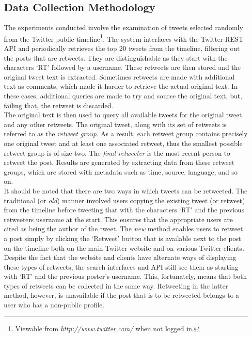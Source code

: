 \subsection{Data Collection Methodology}
The experiments conducted involve the examination of tweets selected randomly from the Twitter public timeline\footnote{Viewable from \textit{http://www.twitter.com/} when not logged in.}. The system interfaces with the Twitter REST API and periodically retrieves the top 20 tweets from the timeline, filtering out the posts that are retweets. They are distinguishable as they start with the characters `RT' followed by a username. These retweets are then stored and the original tweet text is extracted. Sometimes retweets are made with additional text as comments, which made it harder to retrieve the actual original text. In these cases, additional queries are made to try and source the original text, but, failing that, the retweet is discarded.\\
The original text is then used to query all available tweets for the original tweet and any other retweets. The original tweet, along with its set of retweets is referred to as the \textit{retweet group}. As a result, each retweet group contains precisely one original tweet and at least one associated retweet, thus the smallest possible retweet group is of size two. The \textit{final retweeter} is the most recent person to retweet the post. Results are generated by extracting data from these retweet groups, which are stored with metadata such as time, source, language, and so on.\\
It should be noted that there are two ways in which tweets can be retweeted. The traditional (or \textit{old}) manner involved users copying the existing tweet (or retweet) from the timeline before tweeting that with the characters `RT' and the previous retweeters username at the start. This ensures that the appropriate users are cited as being the author of the tweet. The \textit{new} method enables users to retweet a post simply by clicking the `Retweet' button that is available next to the post on the timeline both on the main Twitter website and on various Twitter clients. Despite the fact that the website and clients have alternate ways of displaying these types of retweets, the search interfaces and API still see them as starting with `RT' and the previous poster's username. This, fortunately, means that both types of retweets can be collected in the same way. Retweeting in the latter method, however, is unavailable if the post that is to be retweeted belongs to a user who has a non-public profile.\\
